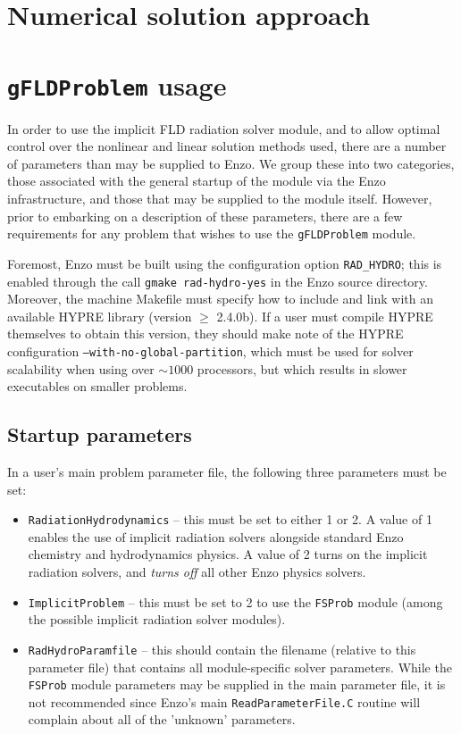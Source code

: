 \documentclass[letterpaper,10pt]{article}
\renewcommand{\(}{\left(}
\renewcommand{\)}{\right)}
\begin{document}
\section{Numerical solution approach}
\label{sec:solution_approach}





\section{{\tt gFLDProblem} usage}
\label{sec:module_usage}

In order to use the implicit FLD radiation solver module, and to
allow optimal control over the nonlinear and linear solution methods
used, there are a number of parameters than may be supplied to Enzo.
We group these into two categories, those associated with the general
startup of the module via the Enzo infrastructure, and those that may
be supplied to the module itself.  However, prior to embarking on a
description of these parameters, there are a few requirements for any
problem that wishes to use the {\tt gFLDProblem} module.

Foremost, Enzo must be built using the configuration option 
{\tt RAD\_HYDRO}; this is enabled through the call 
{\tt gmake rad-hydro-yes} in the Enzo source directory.  Moreover, the
machine Makefile must specify how to include and link with an
available HYPRE library (version $\ge$ 2.4.0b).  If a user must
compile HYPRE themselves to obtain this version, they should make note
of the HYPRE configuration {\tt --with-no-global-partition}, which
must be used for solver scalability when using over $\sim1000$
processors, but which results in slower executables on smaller
problems.


\subsection{Startup parameters}

In a user's main problem parameter file, the following three parameters
must be set:
\begin{itemize}
\item {\tt RadiationHydrodynamics} -- this must be set to either 1 or
  2.  A value of 1 enables the use of implicit radiation solvers
  alongside standard Enzo chemistry and hydrodynamics physics.  A
  value of 2 turns on the implicit radiation solvers, and {\em turns off}  
  all other Enzo physics solvers.
\item {\tt ImplicitProblem} -- this must be set to 2 to use the 
  {\tt FSProb} module (among the possible implicit radiation solver
  modules).
\item {\tt RadHydroParamfile} -- this should contain the filename
  (relative to this parameter file) that contains all module-specific
  solver parameters.  While the {\tt FSProb} module parameters may be
  supplied in the main parameter file, it is not recommended since
  Enzo's main {\tt ReadParameterFile.C} routine will complain about
  all of the 'unknown' parameters.
\end{itemize}
\end{document}
